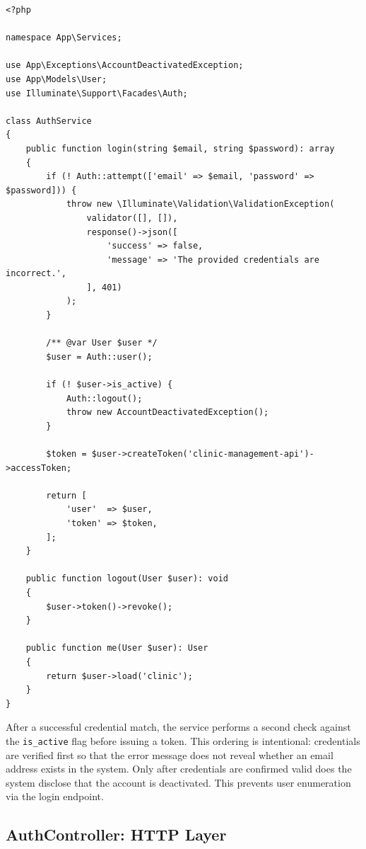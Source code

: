 \begin{lstlisting}[style=php, caption={\texttt{app/Services/AuthService.php} ---
  Credential verification, active account check, and token issuance.}]
<?php

namespace App\Services;

use App\Exceptions\AccountDeactivatedException;
use App\Models\User;
use Illuminate\Support\Facades\Auth;

class AuthService
{
    public function login(string $email, string $password): array
    {
        if (! Auth::attempt(['email' => $email, 'password' => $password])) {
            throw new \Illuminate\Validation\ValidationException(
                validator([], []),
                response()->json([
                    'success' => false,
                    'message' => 'The provided credentials are incorrect.',
                ], 401)
            );
        }

        /** @var User $user */
        $user = Auth::user();

        if (! $user->is_active) {
            Auth::logout();
            throw new AccountDeactivatedException();
        }

        $token = $user->createToken('clinic-management-api')->accessToken;

        return [
            'user'  => $user,
            'token' => $token,
        ];
    }

    public function logout(User $user): void
    {
        $user->token()->revoke();
    }

    public function me(User $user): User
    {
        return $user->load('clinic');
    }
}
\end{lstlisting}

\begin{warningbox}[AccountDeactivatedException]
  After a successful credential match, the service performs a second
  check against the \texttt{is\_active} flag before issuing a token.
  This ordering is intentional: credentials are verified first so that
  the error message does not reveal whether an email address exists in
  the system. Only after credentials are confirmed valid does the system
  disclose that the account is deactivated. This prevents user
  enumeration via the login endpoint.
\end{warningbox}

\subsection{AuthController: HTTP Layer}

